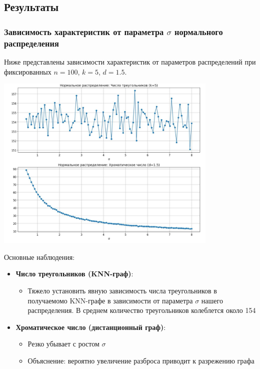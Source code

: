 \documentclass[a4paper,12pt]{article}
\begin{document}
\subsection{Результаты}

\subsubsection{Зависимость характеристик от параметра $\sigma$ нормального распределения}
Ниже представлены зависимости характеристик от параметров распределений при фиксированных $n=100$, $k=5$, $d=1.5$.

\begin{center}
\includegraphics[width=0.8\textwidth]{images/normal_sigmas.png}
\end{center}

Основные наблюдения:
\begin{itemize}
    \item \textbf{Число треугольников (KNN-граф)}:
    \begin{itemize}
        \item Тяжело установить явную зависимость числа треугольников в получаемомо KNN-графе в зависимости от параметра $\sigma$ нашего распределения. В среднем количество треугольников колеблется около 154
    \end{itemize}
    
    \item \textbf{Хроматическое число (дистанционный граф)}:
    \begin{itemize}
        \item Резко убывает с ростом $\sigma$
        \item Объяснение: вероятно увеличение разброса приводит к разрежению графа
    \end{itemize}
\end{itemize}
\end{document}
